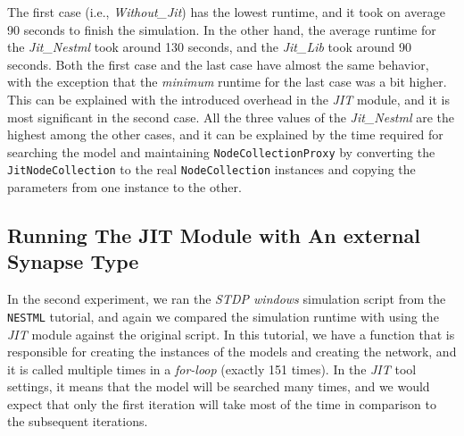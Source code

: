 The first case (i.e., \emph{Without\_Jit}) has the lowest runtime, and it took on average 90 seconds to finish the simulation. In the other hand, the average runtime for the \emph{Jit\_Nestml} took around 130 seconds, and the \emph{Jit\_Lib} took around 90 seconds.  Both the first case and the last case have almost the same behavior, with the exception that the \emph{minimum} runtime for the last case was a bit higher. This can be explained with the introduced overhead in the \emph{JIT} module, and it is most significant in the second case. All the three values of the \emph{Jit\_Nestml} are the highest among the other cases, and it can be explained by the time required for searching the model and maintaining \texttt{NodeCollectionProxy} by converting the \texttt{JitNodeCollection} to the real \texttt{NodeCollection} instances and copying the parameters from one instance to the other.


\subsection*{Running The JIT Module with An external Synapse Type}

In the second experiment, we ran the \emph{STDP windows} simulation script from the \texttt{NESTML} tutorial, and again we compared the simulation runtime with using the \emph{JIT} module against the original script. In this tutorial, we have a function that is responsible for creating the instances of the models and creating the network, and it is called multiple times in a \emph{for-loop} (exactly 151 times). In the \emph{JIT} tool settings, it means that the model will be searched many times, and we would expect that only the first iteration will take most of the time in comparison to the subsequent iterations. 

